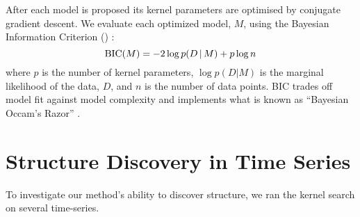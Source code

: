 After each model is proposed its kernel parameters are optimised by conjugate gradient descent.
We evaluate each optimized model, $M$, using the Bayesian Information Criterion (\BIC{}) \citep{schwarz1978estimating}:
\begin{equation}
\textnormal{BIC}(M) = -2 \log p(D\,|\, M) + p \log n
\end{equation}
where $p$ is the number of kernel parameters, $\log p(D|M)$ is the marginal likelihood of the data, $D$, and $n$ is the number of data points.
BIC trades off model fit against model complexity and implements what is known as ``Bayesian Occam's Razor'' \citep{rasmussen2001occam,mackay2003information}.





\section{Structure Discovery in Time Series}
\label{sec:time_series}


To investigate our method's ability to discover structure, we ran the kernel search on several time-series.

